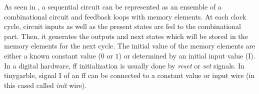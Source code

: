 As seen in , a sequential circuit can be represented as an ensemble of a combinational circuit and feedback loops with memory elements.
At each clock cycle, circuit inputs as well as the present states are fed to the combinational part.
Then, it generates the outputs and next states which will be stored in the memory elements for the next cycle.
The initial value of the memory elements are either a known constant value ($0$ or $1$) or determined by an initial input value (I).
In a digital hardware, \acrshort{ff} initialization is usually done by \emph{reset} or \emph{set} signals.
In \gls{tinygarble}, signal I of an \acrshort{ff} can be connected to a constant value or input wire (in this cased called \emph{init} wire).
